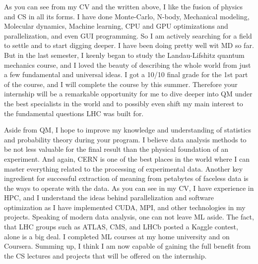 \documentclass[12pt, a4paper]{awesome-cv}
\begin{document}
\begin{cvletter}
As you can see from my CV and the written above, I like the fusion of physics and CS in all its forms. I have done Monte-Carlo, N-body, Mechanical modeling, Molecular dynamics, Machine learning, CPU and GPU optimizations and parallelization, and even GUI programming. So I am actively searching for a field to settle and to start digging deeper. I have been doing pretty well wit MD so far. But in the last semester, I keenly began to study the Landau-Lifshitz quantum mechanics course, and I loved the beauty of describing the whole world from just a few fundamental and universal ideas. I got a 10/10 final grade for the 1st part of the course, and I will complete the course by this summer. Therefore your internship will be a remarkable opportunity for me to dive deeper into QM under the best specialists in the world and to possibly even shift my main interest to the fundamental questions LHC was built for. 

\newpage

Aside from QM, I hope to improve my knowledge and understanding of statistics and probability theory during your program. I believe data analysis methods to be not less valuable for the final result than the physical foundation of an experiment. And again, CERN is one of the best places in the world where I can master everything related to the processing of experimental data. Another key ingredient for successful extraction of meaning from petabytes of faceless data is the ways to operate with the data. As you can see in my CV, I have experience in HPC, and I understand the ideas behind parallelization and software optimization as I have implemented CUDA, MPI, and other technologies in my projects. Speaking of modern data analysis, one can not leave ML aside. The fact, that LHC groups such as ATLAS, CMS, and LHCb posted a Kaggle contest, alone is a big deal. I completed ML courses at my home university and on Coursera. Summing up, I think I am now capable of gaining the full benefit from the CS lectures and projects that will be offered on the internship.


\end{cvletter}
\end{document}
